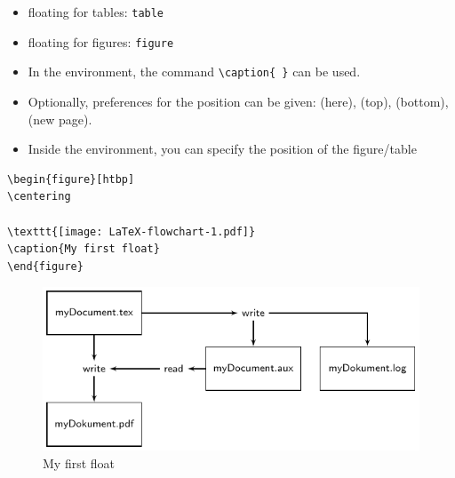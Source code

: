 \begin{frame}[fragile]

\begin{itemize}
	\item floating for tables: \lstinline|table|
	
	\item floating for figures: \lstinline|figure|
	
	\item In the environment, the command \lstinline|\caption{ }| can be used.
	
	\item Optionally, preferences for the position can be given:  (here),  (top),  (bottom),  (new page).
	
	\item Inside the environment, you can specify the position of the figure/table
\end{itemize}	

\begin{multicols}{2}
	
\begin{lstlisting}
\begin{figure}[htbp]
\centering

\texttt{[image: LaTeX-flowchart-1.pdf]}
\caption{My first float}
\end{figure}
\end{lstlisting}

\columnbreak

\begin{figure}[htbp]
\includegraphics[scale=0.5]{../../texfiles-beamer/tex-material/WissArb-latex/LaTeX-flowchart-1.pdf}
\caption{My first float}
\label{fig:latex-flowchart}
\end{figure}
\end{multicols}

\end{frame}


